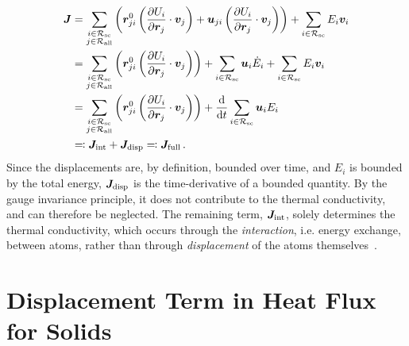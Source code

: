 \begin{align}
	\J &=
		\sum_{\substack{i \in \Rsc \\ j \in \Rall}} \left(\Rr_{ji} \left(\dur{i}{j}{} \cdot \V_j \right)
		+ \U_{ji} \left(\dur{i}{j}{} \cdot \V_j\right) \right) 
		+ \sum_{i \in \Rsc} E_i \V_i \\
		&= \sum_{\substack{i \in \Rsc \\ j \in \Rall}} \left(\Rr_{ji} \left(\dur{i}{j}{} \cdot \V_j\right) \right)
		+ \sum_{i \in \Rsc} \U_i \dot E_i
		+ \sum_{i \in \Rsc} E_i \V_i \\
		&= 
		\sum_{\substack{i \in \Rsc \\ j \in \Rall}} \left(\Rr_{ji} \left(\dur{i}{j}{} \cdot \V_j\right) \right)
		+ \totaldiff{t} \sum_{i \in \Rsc} \U_i E_i \\
		&\defdas \Jint + \Jdiff \defdas \Jfull \, . \label{eq:si-hf_jfull}
\end{align}
\noindent
Since the displacements are, by definition, bounded over time, and $E_i$ is bounded by the total energy, $\boldsymbol{J}_\text{disp}$ is the time-derivative of a bounded quantity. By the gauge invariance principle, it does not contribute to the thermal conductivity, and can therefore be neglected. The remaining term, $\boldsymbol{J}_\text{int}$, solely determines the thermal conductivity, which occurs through the \emph{interaction}, i.e. energy exchange, between atoms, rather than through \emph{displacement} of the atoms themselves~\cite{mub2016t,ibdb2019t}.

\section{Displacement Term in Heat Flux for Solids}
\label{sec:si-hf_displacement}

